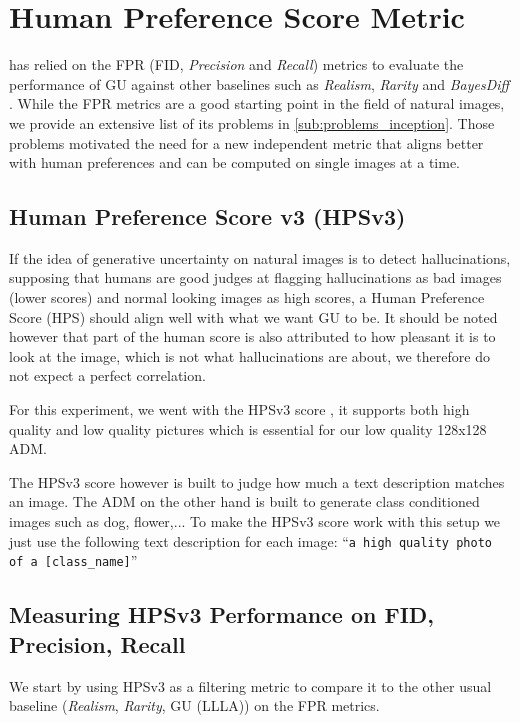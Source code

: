 \chapter{Human Preference Score Metric}
\label{ch:hpsv3}


\cite{jazbec_generative_2025} has relied on the \acs{FPR} (\acs{FID}, \emph{Precision} and \emph{Recall}) metrics to evaluate the performance of \acs{GU} against other baselines such as \emph{Realism}, \emph{Rarity} and \emph{BayesDiff} \parencite{kou_bayesdiff_2024}.
While the \acs{FPR} metrics are a good starting point in the field of natural images, we provide an extensive list of its problems in \autoref{sub:problems_inception}. Those problems motivated the need for a new independent metric that aligns better with human preferences and can be computed on single images at a time.

\section{Human Preference Score v3 (HPSv3)}

If the idea of generative uncertainty on natural images is to detect hallucinations, supposing that humans are good judges at flagging hallucinations as bad images (lower scores) and normal looking images as high scores, a Human Preference Score (\acs{HPS}) should align well with what we want \acs{GU} to be.
It should be noted however that part of the human score is also attributed to how pleasant it is to look at the image, which is not what hallucinations are about, we therefore do not expect a perfect correlation.

For this experiment, we went with the HPSv3 score \parencite{ma_hpsv3_2025}, it supports both high quality and low quality pictures which is essential for our low quality 128x128 \acs{ADM}.

The HPSv3 score however is built to judge how much a text description matches an image. The \acs{ADM} on the other hand is built to generate class conditioned images such as dog, flower,... To make the HPSv3 score work with this setup we just use the following text description for each image: ``\texttt{a high quality photo of a [class\_name]}''

\section{Measuring HPSv3 Performance on FID, Precision, Recall}

We start by using HPSv3 as a filtering metric to compare it to the other usual baseline (\emph{Realism}, \emph{Rarity}, \acs{GU} (LLLA)) on the \acs{FPR} metrics.

